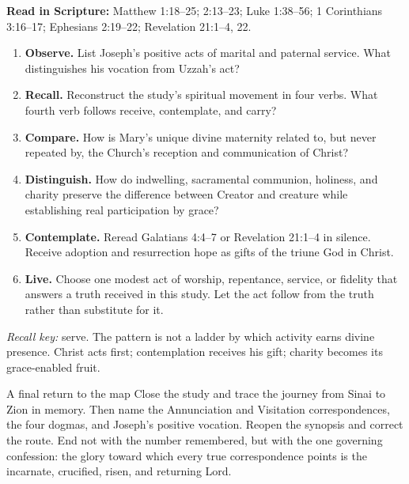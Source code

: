 \textbf{Read in Scripture:} Matthew 1:18--25; 2:13--23; Luke 1:38--56;
1 Corinthians 3:16--17; Ephesians 2:19--22; Revelation 21:1--4, 22.

\begin{enumerate}
  \item \textbf{Observe.} List Joseph's positive acts of marital and paternal
  service.  What distinguishes his vocation from Uzzah's act?
  \item \textbf{Recall.} Reconstruct the study's spiritual movement in four
  verbs.  What fourth verb follows receive, contemplate, and carry?
  \item \textbf{Compare.} How is Mary's unique divine maternity related to,
  but never repeated by, the Church's reception and communication of Christ?
  \item \textbf{Distinguish.} How do indwelling, sacramental communion, holiness,
  and charity preserve the difference between Creator and creature while
  establishing real participation by grace?
  \item \textbf{Contemplate.} Reread Galatians 4:4--7 or Revelation 21:1--4
  in silence.  Receive adoption and resurrection hope as gifts of the triune
  God in Christ.
  \item \textbf{Live.} Choose one modest act of worship, repentance, service,
  or fidelity that answers a truth received in this study.  Let the act follow
  from the truth rather than substitute for it.
\end{enumerate}

\textit{Recall key:} serve.  The pattern is not a ladder by which activity
earns divine presence.  Christ acts first; contemplation receives his gift;
charity becomes its grace-enabled fruit.

\begin{studybox}{A final return to the map}
Close the study and trace the journey from Sinai to Zion in memory.  Then name
the Annunciation and Visitation correspondences, the four dogmas, and Joseph's
positive vocation.  Reopen the synopsis and correct the route.  End not with
the number remembered, but with the one governing confession: the glory toward
which every true correspondence points is the incarnate, crucified, risen, and
returning Lord.
\end{studybox}

